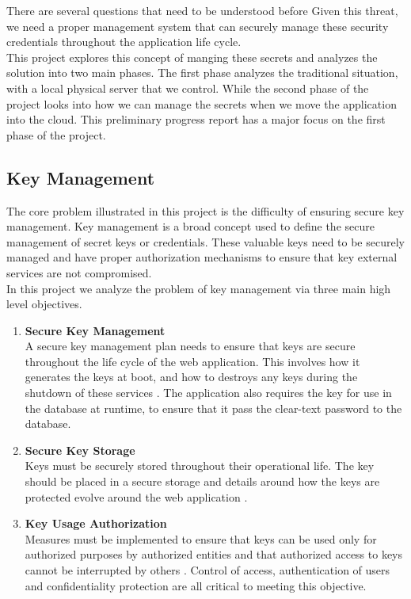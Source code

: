 \documentclass[11pt, a4paper, twoside, notitlepage]{article}
\begin{document}
There are several questions that need to be understood before 
Given this threat, we need a proper management system that can securely manage these security credentials throughout the application life cycle.\\

This project explores this concept of manging these secrets and analyzes the solution into two main phases. The first phase analyzes the traditional situation, with a local physical server that we control. While the second phase of the project looks into how we can manage the secrets when we move the application into the cloud. This preliminary progress report has a major focus on the first phase of the project. 

\subsection*{Key Management}
The core problem illustrated in this project is the difficulty of ensuring secure key management. Key management is a broad concept used to define the secure management of secret keys or credentials. These valuable keys need to be securely managed and have proper authorization mechanisms to ensure that key external services are not compromised. \\

In this project we analyze the problem of key management via three main high level objectives.

\begin{enumerate}
\item \textbf{Secure Key Management} \\
A secure key management plan needs to ensure that keys are secure throughout the life cycle of the web application. This involves how it generates the keys at boot, and how to destroys any keys during the shutdown of these services \cite{entrprise-guide}. The application also requires the key for use in the database at runtime, to ensure that it pass the clear-text password to the database.

\item \textbf{Secure Key Storage} \\
Keys must be securely stored throughout their operational life. The key should be placed in a secure storage and details around how the keys are protected evolve around the web application  \cite{entrprise-guide}. 

\item \textbf{Key Usage Authorization} \\
Measures must be implemented to ensure that keys can be used only for authorized  purposes by authorized entities and that authorized access to keys cannot be interrupted by others  \cite{entrprise-guide}. Control of access, authentication of users and confidentiality protection are all critical to meeting this objective.
\end{enumerate}
\end{document}
